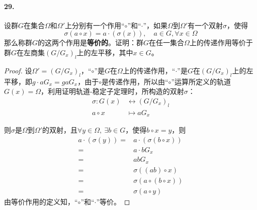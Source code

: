\documentclass[12pt, a4paper, oneside]{ctexart}
\begin{document}
\paragraph{29.}设群$G$在集合$\Omega$和$\Omega'$上分别有一个作用“$\circ$”和“$\cdot$”，如果$\Omega$到$\Omega'$有一个双射$\sigma$，使得
\begin{equation*}
    \sigma(a\circ x) = a\cdot(\sigma(x)) ,\quad a\in G,\forall x\in \Omega
\end{equation*}
那么称群$G$的这两个作用是\textbf{等价的}。证明：群$G$在任一集合$\Omega$上的传递作用等价于群$G$在左商集$(G/G_x)_l$上的左平移，其中$x\in G$。
\begin{proof}
    设$\Omega' = (G/G_x)_l$，“$\circ$”是$G$在$\Omega$上的传递作用，“$\cdot$”是$G$在$(G/G_x)_l$上的左平移，即$g\cdot aG_x = gaG_x$，由于$\circ$是传递作用，所以由“$\circ$”运算所定义的轨道$G(x)=\Omega$，利用证明$\text{轨道-稳定子定理}$时，所构造的双射$\sigma$：
    \begin{equation*}
        \begin{aligned}
            \sigma:G(x)&\leftrightarrow (G/G_x)_l\\
            a\circ x&\mapsto aG_x
        \end{aligned}
    \end{equation*}

    则$\sigma$是$\Omega$到$\Omega'$的双射，且$\forall y\in \Omega,\ \exists b\in G$，使得$b\circ x = y$，则
    \begin{equation*}
        \begin{aligned}
            a\cdot(\sigma(y)) =& a\cdot(\sigma(b\circ x))\\
            =& a\cdot bG_x\\
            =& abG_x\\
            =& \sigma((ab)\circ x)\\
            =& \sigma(a\circ(b\circ x))\\
            =& \sigma(a\circ y)
        \end{aligned}
    \end{equation*}
    由等价作用的定义知，“$\circ$”和“$\cdot$”等价。

\end{proof}
\end{document}
